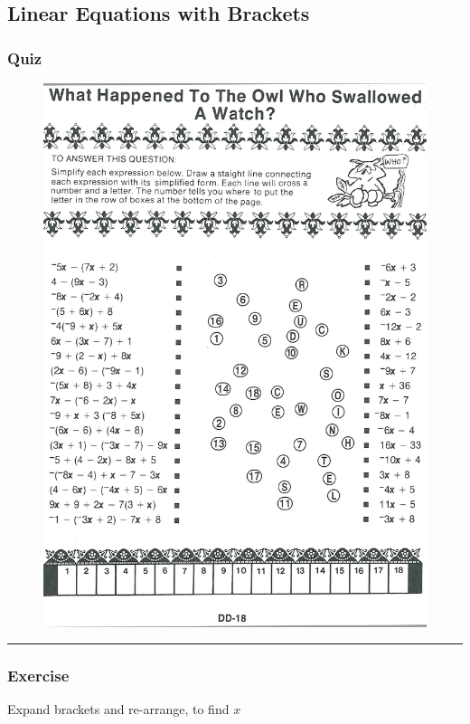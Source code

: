 \documentclass[a4paper,12pt]{article}
\newcommand\question{
	 \rule[0pt]{17cm}{0.5pt}\vspace{-0.5cm}
	\subsubsection{Exercise}

}
\newcommand\quiz{
\subsubsection{Quiz}\vspace{-0.5cm}
}
\begin{document}
\subsection{Linear Equations with Brackets}
\quiz
\begin{figure}[!h]
	\centering
	\includegraphics[width=16cm, angle=0, origin=c]{pizzazz/pizzazz_set1_8.pdf}
\end{figure}
\newpage
\question
Expand brackets and re-arrange, to find $x$ 
\end{document}
